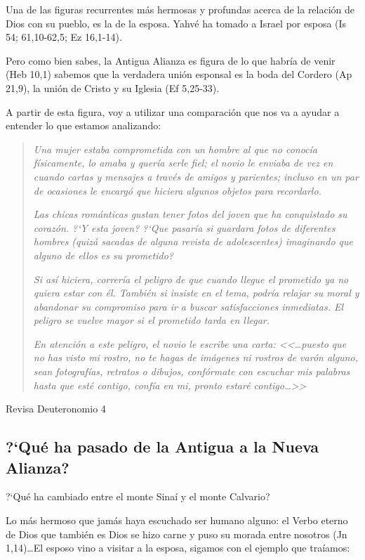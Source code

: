 \documentclass{article}
\begin{document}
Una de las figuras recurrentes m\'as hermosas y profundas acerca de la relaci\'on de Dios con su pueblo, es la de la esposa. Yahv\'e ha tomado a Israel por esposa (Is 54; 61,10-62,5; Ez 16,1-14).

Pero como bien sabes, la Antigua Alianza es figura de lo que habr\'{i}a de venir (Heb 10,1) sabemos que la verdadera uni\'on esponsal es la boda del Cordero (Ap 21,9), la uni\'on de Cristo y su Iglesia (Ef 5,25-33).

A partir de esta figura, voy a utilizar una comparaci\'on que nos va a ayudar a entender lo que estamos analizando:

\begin{quote}
\emph{Una mujer estaba comprometida con un hombre al que no conoc\'{i}a f\'{i}sicamente, lo amaba y quer\'{i}a serle fiel; el novio le enviaba de vez en cuando cartas y mensajes a trav\'es de amigos y parientes; incluso en un par de ocasiones le encarg\'o que hiciera algunos objetos para recordarlo.}

\emph{Las chicas rom\'anticas gustan tener fotos del joven que ha conquistado su coraz\'on. ?`Y esta joven? ?`Que pasar\'{i}a si guardara fotos de diferentes hombres (quiz\'a sacadas de alguna revista de adolescentes) imaginando que alguno de ellos es su prometido?}

\emph{Si as\'{i} hiciera, correr\'{i}a el peligro de que cuando llegue el prometido ya no quiera estar con \'el. Tambi\'en si insiste en el tema, podr\'{i}a relajar su moral y abandonar su compromiso para ir a buscar satisfacciones inmediatas. El peligro se vuelve mayor si el prometido tarda en llegar.}

\emph{En atenci\'on a este peligro, el novio le escribe una carta: <<{\ldots}puesto que no has visto mi rostro, no te hagas de im\'agenes ni rostros de var\'on alguno, sean fotograf\'{i}as, retratos o dibujos, conf\'ormate con escuchar mis palabras hasta que est\'e contigo, conf\'{i}a en mi, pronto estar\'e contigo\ldots>>}
\end{quote}

Revisa Deuteronomio 4

\hrulefill

\subsection{?`Qu\'e ha pasado de la Antigua a la Nueva Alianza?}
?`Qu\'e ha cambiado entre el monte Sina\'{i} y el monte Calvario?

Lo m\'as hermoso que jam\'as haya escuchado ser humano alguno: el Verbo eterno de Dios que tambi\'en es Dios se hizo carne y puso su morada entre nosotros (Jn 1,14)\ldots El esposo vino a visitar a la esposa, sigamos con el ejemplo que tra\'{i}amos:
\end{document}
